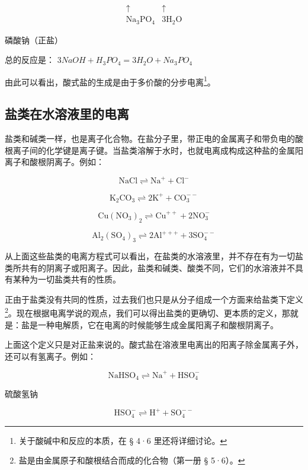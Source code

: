 \[
\begin{array}{cc} \uparrow & \uparrow \\ \mathrm{Na} _ {3} \mathrm{PO} _ {4} & 3 \mathrm{H} _ {2} \mathrm{O} \end{array}
\]

磷酸钠（正盐）

总的反应是： \(3NaOH+H_{3}PO_{4}=3H_{2}O+Na_{3}PO_{4}\)

由此可以看出，酸式盐的生成是由于多价酸的分步电离\footnote{关于酸碱中和反应的本质，在
  § 4·6 里还将详细讨论。}。

\subsection{盐类在水溶液里的电离}

盐类和碱类一样，也是离子化合物。在盐分子里，带正电的金属离子和带负电的酸根离子间的化学键是离子键。当盐类溶解于水时，也就电离成构成这种盐的金属阳离子和酸根阴离子。例如：

\[
\mathrm{NaCl} \rightleftharpoons \mathrm{Na} ^ {+} + \mathrm{Cl} ^ {-}
\]

\[
\mathrm{K} _ {2} \mathrm{CO} _ {3} \rightleftharpoons 2 \mathrm{K} ^ {+} + \mathrm{CO} _ {3} ^ {- -}
\]

\[
\mathrm{Cu} \left(\mathrm{NO} _ {3}\right) _ {2} \rightleftharpoons \mathrm{Cu} ^ {+ +} + 2 \mathrm{NO} _ {3} ^ {-}
\]

\[
\mathrm{Al} _ {2} \left(\mathrm{SO} _ {4}\right) _ {3} \rightleftharpoons 2 \mathrm{Al} ^ {+ + +} + 3 \mathrm{SO} _ {4} ^ {- -}
\]

从上面这些盐类的电离方程式可以看出，在盐类的水溶液里，并不存在有为一切盐类所共有的阴离子或阳离子。因此，盐类和碱类、酸类不同，它们的水溶液并不具有某种为一切盐类共有的性质。

正由于盐类没有共同的性质，过去我们也只是从分子组成一个方面来给盐类下定义\footnote{盐是由金属原子和酸根结合而成的化合物（第一册
  § 5·6）。}。现在根据电离学说的观点，我们可以得出盐类的更确切、更本质的定义，那就是：盐是一种电解质，它在电离的时候能够生成金属阳离子和酸根阴离子。

上面这个定义只是对正盐来说的。酸式盐在溶液里电离出的阳离子除金属离子外，还可以有氢离子。例如：

\[
\mathrm{NaHSO} _ {4} \rightleftharpoons \mathrm{Na} ^ {+} + \mathrm{HSO} _ {4} ^ {-}
\]

硫酸氢钠

\[
\mathrm{HSO} _ {4} ^ {-} \rightleftharpoons \mathrm{H} ^ {+} + \mathrm{SO} _ {4} ^ {- -}
\]

